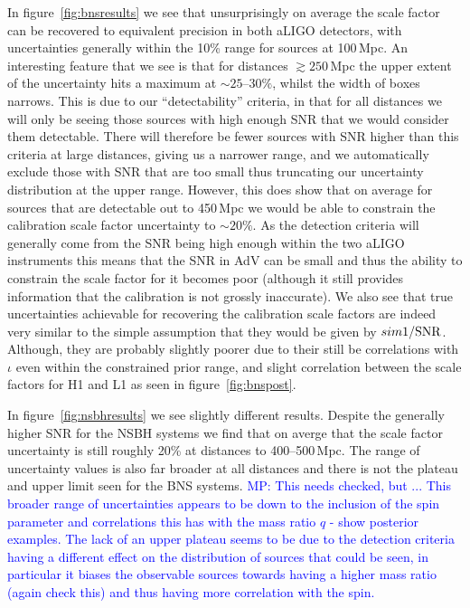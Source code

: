 \documentclass[10pt]{iopart}
\newcommand{\MP}[1]{\textcolor{blue}{MP: #1}}
\begin{document}
In figure~\ref{fig:bnsresults} we see that unsurprisingly on average the scale factor can be 
recovered to equivalent precision in both \ac{aLIGO} detectors, with uncertainties generally within 
the 10\% range for sources at 100\,Mpc. An interesting feature that we see is that for distances 
$\gtrsim 250$\,Mpc the upper extent of the uncertainty hits a maximum at $\sim 25\mbox{--}30\%$, 
whilst the width of boxes narrows. This is due to our ``detectability'' criteria, in that for all 
distances we will only be seeing those sources with high enough SNR that we would consider them 
detectable. There will therefore be fewer sources with SNR higher than this criteria at large 
distances, giving us a narrower range, and we automatically exclude those with SNR that are too 
small thus truncating our uncertainty distribution at the upper range. However, this does show that 
on average for sources that are detectable out to 450\,Mpc we would be able to constrain the 
calibration scale factor uncertainty to $\sim 20\%$. As the detection criteria will generally come 
from the SNR being high enough within the two \ac{aLIGO} instruments this means that the SNR in 
\ac{AdV} can be small and thus the ability to constrain the scale factor for it becomes poor 
(although it still provides information that the calibration is not grossly inaccurate). We also 
see that true uncertainties achievable for recovering the calibration scale factors are indeed very 
similar to the simple assumption that they would be given by $sim 1/{\rm SNR}$. Although, they are 
probably slightly poorer due to their still be correlations with $\iota$ even within the 
constrained prior range, and slight correlation between the scale factors for H1 and L1 as seen in 
figure~\ref{fig:bnspost}.

In figure~\ref{fig:nsbhresults} we see slightly different results. Despite the generally higher SNR 
for the \ac{NSBH} systems we find that on averge that the scale factor uncertainty is still roughly 
20\% at distances to 400--500\,Mpc. The range of uncertainty values is also far broader at all 
distances and there is not the plateau and upper limit seen for the \ac{BNS} systems. \MP{This 
needs checked, but ... This broader range of uncertainties appears to be down to the inclusion of 
the spin parameter and correlations this has with the mass ratio $q$ - show posterior examples. The 
lack of an upper plateau seems to be due to the detection criteria having a different effect on the 
distribution of sources that could be seen, in particular it biases the observable sources towards 
having a higher mass ratio (again check this) and thus having more correlation with the spin.}
\end{document}
